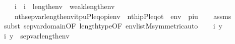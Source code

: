 \begin{isabellebody}
\ \ \ {\isachardoublequoteopen}{\isasymforall}\ i\ {\isachardot}{\kern0pt}\ i\ {\isasymin}\ {\isacharparenleft}{\kern0pt}{}{\isacharhash}{\kern0pt}{\isacharplus}{\kern0pt}length{\isacharparenleft}{\kern0pt}env{\isacharparenright}{\kern0pt}{\isacharparenright}{\kern0pt}\ {\isacharminus}{\kern0pt}\ weak{\isacharparenleft}{\kern0pt}length{\isacharparenleft}{\kern0pt}env{\isacharparenright}{\kern0pt}{\isacharcomma}{\kern0pt}{}{\isacharparenright}{\kern0pt}\ {\isasymlongrightarrow}\ \isanewline
\ \ \ \ nth{\isacharparenleft}{\kern0pt}sep{\isacharunderscore}{\kern0pt}var{\isacharparenleft}{\kern0pt}length{\isacharparenleft}{\kern0pt}env{\isacharparenright}{\kern0pt}{\isacharparenright}{\kern0pt}{\isacharbackquote}{\kern0pt}i{\isacharcomma}{\kern0pt}{\isacharbrackleft}{\kern0pt}t{\isacharcomma}{\kern0pt}p{\isacharcomma}{\kern0pt}u{\isacharcomma}{\kern0pt}P{\isacharcomma}{\kern0pt}leq{\isacharcomma}{\kern0pt}o{\isacharcomma}{\kern0pt}pi{\isacharbrackright}{\kern0pt}{\isacharat}{\kern0pt}env{\isacharparenright}{\kern0pt}\ {\isacharequal}{\kern0pt}\ nth{\isacharparenleft}{\kern0pt}i{\isacharcomma}{\kern0pt}{\isacharbrackleft}{\kern0pt}p{\isacharcomma}{\kern0pt}P{\isacharcomma}{\kern0pt}leq{\isacharcomma}{\kern0pt}o{\isacharcomma}{\kern0pt}t{\isacharbrackright}{\kern0pt}\ {\isacharat}{\kern0pt}\ env\ {\isacharat}{\kern0pt}\ {\isacharbrackleft}{\kern0pt}pi{\isacharcomma}{\kern0pt}u{\isacharbrackright}{\kern0pt}{\isacharparenright}{\kern0pt}{\isachardoublequoteclose}\isanewline
%
\isadelimproof
\ \ %
\endisadelimproof
%
\isatagproof
{}\isamarkupfalse%
\ assms\isanewline
{}\isamarkupfalse%
\ {\isacharparenleft}{\kern0pt}subst\ sep{\isacharunderscore}{\kern0pt}var{\isacharunderscore}{\kern0pt}domain{\isacharbrackleft}{\kern0pt}OF\ length{\isacharunderscore}{\kern0pt}type{\isacharbrackleft}{\kern0pt}OF\ {\isacartoucheopen}env{\isasymin}list{\isacharparenleft}{\kern0pt}M{\isacharparenright}{\kern0pt}{\isacartoucheclose}{\isacharbrackright}{\kern0pt}{\isacharcomma}{\kern0pt}symmetric{\isacharbrackright}{\kern0pt}{\isacharcomma}{\kern0pt}auto{\isacharparenright}{\kern0pt}\isanewline
\ \ \isamarkupfalse%
\ i\ y\isanewline
\ \ \isamarkupfalse%
\ {\isachardoublequoteopen}{\isasymlangle}i{\isacharcomma}{\kern0pt}\ y{\isasymrangle}\ {\isasymin}\ sep{\isacharunderscore}{\kern0pt}var{\isacharparenleft}{\kern0pt}length{\isacharparenleft}{\kern0pt}env{\isacharparenright}{\kern0pt}{\isacharparenright}{\kern0pt}{\isachardoublequoteclose}\isanewline
\ \ \isamarkupfalse%

\end{isabellebody}
